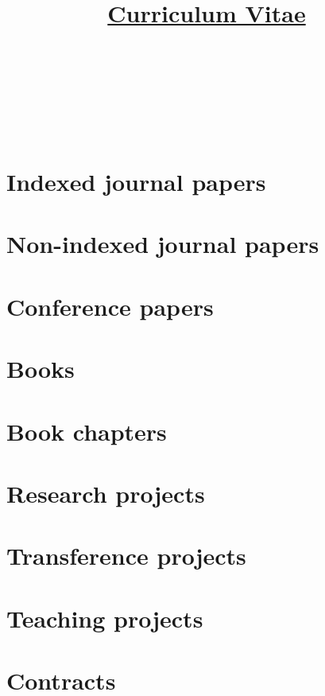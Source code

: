 \documentclass{article}
\title{\href{https://github.com/vicente-gonzalez-ruiz/ridiculum}{Curriculum Vitae}}
\author{
  \begin{tabular}{c}
      \\
    ~\\
     \\
     \\
     \\
    ~\\
     \\
    
  \end{tabular}
}
\begin{document}
\maketitle

\tableofcontents

\renewcommand{\refname}{}
\section{Indexed journal papers}


\section{Non-indexed journal papers}


\renewcommand{\refname}{}
\section{Conference papers}


\renewcommand{\refname}{}
\section{Books}


\renewcommand{\refname}{}
\section{Book chapters}


\renewcommand{\refname}{}
\section{Research projects}


\renewcommand{\refname}{}
\section{Transference projects}


\renewcommand{\refname}{}
\section{Teaching projects}


\renewcommand{\refname}{}
\section{Contracts}

\end{document}
